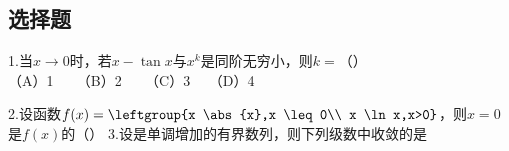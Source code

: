 
\subsection{选择题}
1.当$x \to 0$时，若$x-\tan x$与$x^k$是同阶无穷小，则$k=$（）\\
（A）1 $ \quad$ （B）2 $\quad$ （C）3  $\quad$（D）4 $\quad$

2.设函数$f(x)=\leftgroup{x \abs{x},x \leq 0\\ x \ln x,x>0}$，则$x=0$是$f(x)$的（）
3.设是单调增加的有界数列，则下列级数中收敛的是